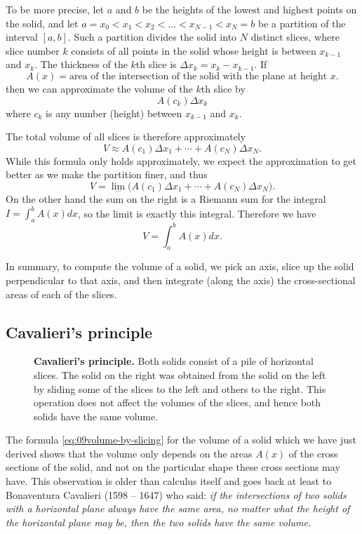 To be more precise, let $a$ and $b$ be the heights of the lowest and highest
points on the solid, and let $a=x_0<x_1<x_2<\ldots<x_{N-1}<x_N=b$ be a partition
of the interval $[a, b]$.  Such a partition divides the solid into $N$ distinct
slices, where slice number $k$ consists of all points in the solid whose height
is between $x_{k-1}$ and $x_k$.  The thickness of the $k$th slice is $\Delta x_k
= x_k-x_{k-1}$.  If
\[
A(x) = \text{area of the intersection of the solid with the plane at height
  $x$.}
\]
then we can approximate the volume of the $k$th slice by
\[
A(c_k) \Delta x_k
\]
where $c_k$ is any number (height) between $x_{k-1}$ and $x_k$.

The total volume of all slices is therefore approximately
\[
V\approx A(c_1)\Delta x_1 + \cdots + A(c_N)\Delta x_N.
\]
While this formula only holds approximately, we expect the approximation to get
better as we make the partition finer, and thus
\begin{equation}
  \label{eq:09vol-of-all-slices}
  V = \lim_{\cdots} \bigl(A(c_1)\Delta x_1 + \cdots + A(c_N)\Delta x_N\bigr).
\end{equation}
On the other hand the sum on the right is a Riemann sum for the integral $I=
\int_a^b A(x) dx$, so the limit is exactly this integral.  Therefore we have
\begin{equation}\label{eq:09volume-by-slicing}
  V = \int_a^b A(x)dx.
\end{equation}

In summary, to compute the volume of a solid, we pick an axis, slice up the solid perpendicular to that axis, and then integrate (along the axis) the cross-sectional areas of each of the slices.


\subsection{Cavalieri's principle} %
\begin{figure}[b]
  \centerline{}

  \caption{\textbf{Cavalieri's principle. }  Both solids consist of a pile of
    horizontal slices. The solid on the right was obtained from the solid on the
    left by sliding some of the slices to the left and others to the right.
    This operation does not affect the volumes of the slices, and hence both
    solids have the same volume.}
\end{figure}
The formula \eqref{eq:09volume-by-slicing} for the volume of a solid which we
have just derived shows that the volume only depends on the areas $A(x)$ of the
cross sections of the solid, and not on the particular shape these cross
sections may have.  This observation is older than calculus itself and goes back
at least to Bonaventura Cavalieri (1598 -- 1647) who said: {\itshape if the
  intersections of two solids with a horizontal plane always have the same area,
  no matter what the height of the horizontal plane may be, then the two solids
  have the same volume.  }

